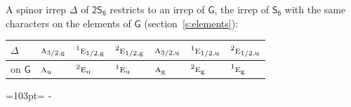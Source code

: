 \documentclass[10pt,a4paper]{article}
\newcommand{\needspace}[1]{\par\penalty-100\begingroup\dimen0=#1\relax\dimen2=\pagegoal
  \advance\dimen2-\pagetotal\ifdim\dimen0>\dimen2\relax\ifdim\dimen2>0pt\vfil\break\fi\fi
  \endgroup}
\numberwithin{equation}{section}
\newcommand{\grp}[1]{\mathsf{#1}}
\newcommand{\irr}[1]{\text{\normalfont\scshape #1}}
\newcommand{\conjpair}[1]{{}^{#1}}
\newcommand{\ptag}[1]{\mathrm{#1}}
\begin{document}
A spinor irrep $\Delta$ of \href{2S6.pdf}{$\grp{2S_{6}}$} restricts to an irrep of $\grp{G}$, the irrep of $\grp{S_{6}}$ with the same characters on the elements of $\grp{G}$ (section~\ref{s:elements}):
\begin{center}\begin{tabular}{@{}lllllll@{}}\toprule
$\Delta$ & $\irr{a}_{3/2,\ptag{g}}$ & $\conjpair{1}\irr{e}_{1/2,\ptag{g}}$ & $\conjpair{2}\irr{e}_{1/2,\ptag{g}}$ & $\irr{a}_{3/2,\ptag{u}}$ & $\conjpair{1}\irr{e}_{1/2,\ptag{u}}$ & $\conjpair{2}\irr{e}_{1/2,\ptag{u}}$\\\midrule
on $\grp{G}$ & $\irr{a}_{\ptag{u}}$ & $\conjpair{2}\irr{e}_{\ptag{u}}$ & $\conjpair{1}\irr{e}_{\ptag{u}}$ & $\irr{a}_{\ptag{g}}$ & $\conjpair{2}\irr{e}_{\ptag{g}}$ & $\conjpair{1}\irr{e}_{\ptag{g}}$\\
\bottomrule\end{tabular}\end{center}
\needspace{103pt}
\end{document}
